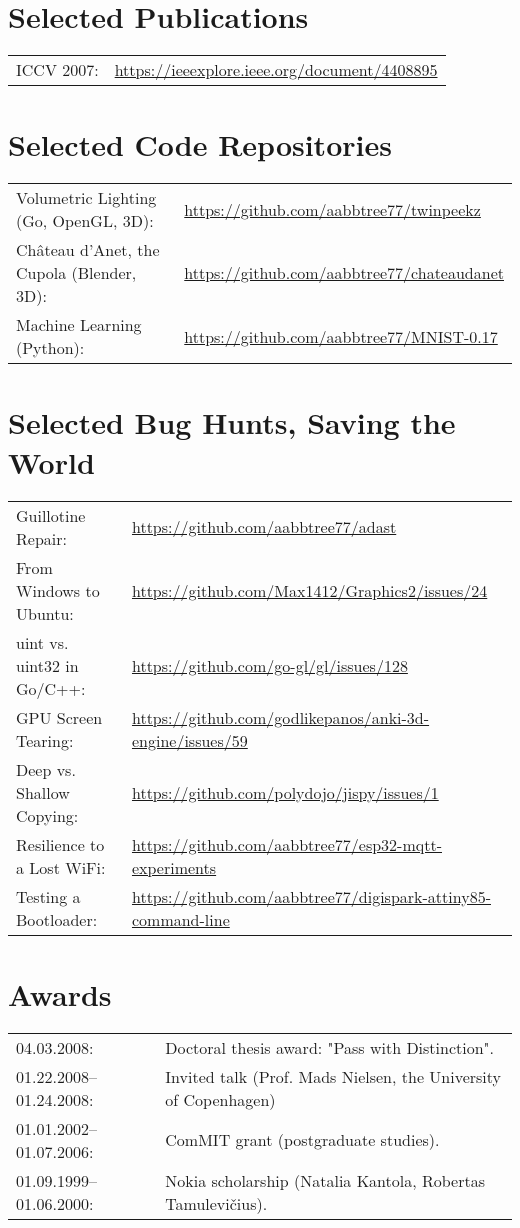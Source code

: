 \documentclass[a4paper,11pt]{article}
\begin{document}
\section*{Selected Publications}
\label{sect:pubs}

\begin{tabular}{ll}
ICCV 2007:& \url{https://ieeexplore.ieee.org/document/4408895}
\end{tabular}


%
\section*{Selected Code Repositories}
\begin{tabular}{ll}
Volumetric Lighting (Go, OpenGL, 3D): & \url{https://github.com/aabbtree77/twinpeekz}\\
Château d'Anet, the Cupola (Blender, 3D): & \url{https://github.com/aabbtree77/chateaudanet}\\
Machine Learning (Python): & \url{https://github.com/aabbtree77/MNIST-0.17}
\end{tabular}

%
\section*{Selected Bug Hunts, Saving the World}
\begin{tabular}{ll}
Guillotine Repair: & \url{https://github.com/aabbtree77/adast}\\
From Windows to Ubuntu: & \url{https://github.com/Max1412/Graphics2/issues/24}\\
uint vs. uint32 in Go/C++: & \url{https://github.com/go-gl/gl/issues/128}\\
GPU Screen Tearing: & \url{https://github.com/godlikepanos/anki-3d-engine/issues/59}\\
Deep vs. Shallow Copying: & \url{https://github.com/polydojo/jispy/issues/1}\\
Resilience to a Lost WiFi: & \url{https://github.com/aabbtree77/esp32-mqtt-experiments}\\
Testing a Bootloader: & \url{https://github.com/aabbtree77/digispark-attiny85-command-line}\\
\end{tabular}

%
%
\section*{Awards}
%
\begin{tabular}{ll}
        04.03.2008: & Doctoral thesis award: "Pass with Distinction".\\
        01.22.2008--01.24.2008: & Invited talk (Prof. Mads Nielsen, the University of Copenhagen)\\
        01.01.2002--01.07.2006:& ComMIT grant (postgraduate studies).\\
        01.09.1999--01.06.2000:& Nokia scholarship (Natalia Kantola, Robertas Tamulevi\v{c}ius).
\end{tabular}
%
%

\end{document}
